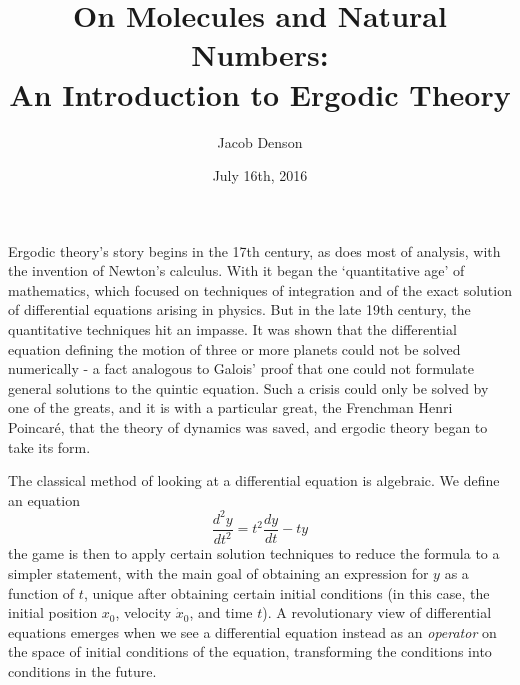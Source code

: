 \documentclass{article}
\title{On Molecules and Natural Numbers:\\
An Introduction to Ergodic Theory}
\author{Jacob Denson}
\date{July 16th, 2016}
\theoremstyle{plain}
\theoremstyle{definition}
\begin{document}

\maketitle



Ergodic theory's story begins in the 17th century, as does most of analysis, with the invention of Newton's calculus. With it began the `quantitative age' of mathematics, which focused on techniques of integration and of the exact solution of differential equations arising in physics. But in the late 19th century, the quantitative techniques hit an impasse. It was shown that the differential equation defining the motion of three or more planets could not be solved numerically - a fact analogous to Galois' proof that one could not formulate general solutions to the quintic equation. Such a crisis could only be solved by one of the greats, and it is with a particular great, the Frenchman Henri Poincar\'{e}, that the theory of dynamics was saved, and ergodic theory began to take its form.

The classical method of looking at a differential equation is algebraic. We define an equation
%
\[ \frac{d^2 y}{dt^2} = t^2 \frac{dy}{dt} - ty \]
%
the game is then to apply certain solution techniques to reduce the formula to a simpler statement, with the main goal of obtaining an expression for $y$ as a function of $t$, unique after obtaining certain initial conditions (in this case, the initial position $x_0$, velocity $\dot{x}_0$, and time $t$). A revolutionary view of differential equations emerges when we see a differential equation instead as an {\it operator} on the space of initial conditions of the equation, transforming the conditions into conditions in the future.
\end{document}
